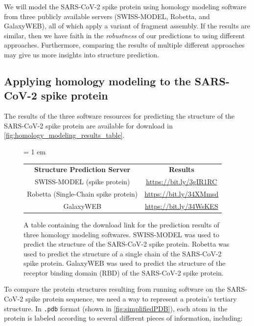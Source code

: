 We will model the SARS-CoV-2 spike protein using homology modeling software from three publicly available servers (SWISS-MODEL, Robetta, and GalaxyWEB), all of which apply a variant of fragment assembly. If the results are similar, then we have faith in the \textit{robustness} of our predictions to using different approaches. Furthermore, comparing the results of multiple different approaches may give us more insights into structure prediction. 

\FloatBarrier
{}
\subsection{Applying homology modeling to the SARS-CoV-2 spike protein}

The results of the three software resources for predicting the structure of the SARS-CoV-2 spike protein are available for download in \autoref{fig:homology_modeling_results_table}.

\begin{figure}[h]
	\raggedleft
	\tabcolsep = 1 em
	\mySfFamily
	\begin{tabular}{c c}
		\textbf{Structure Prediction Server} & \textbf{Results} \\
		SWISS-MODEL (spike protein) & \url{https://bit.ly/3gIR1RC} \\
		Robetta (Single-Chain spike protein) & \url{https://bit.ly/34XMmsd} \\
		GalaxyWEB & \url{https://bit.ly/34WsKES} \\
	\end{tabular}
	\caption{A table containing the download link for the prediction results of three homology modeling softwares. SWISS-MODEL was used to predict the structure of the SARS-CoV-2 spike protein. Robetta was used to predict the structure of a single chain of the SARS-CoV-2 spike protein. GalaxyWEB was used to predict the structure of the receptor binding domain (RBD) of the SARS-CoV-2 spike protein.}
	\label{fig:homology_modeling_results_table}
\end{figure}

To compare the protein structures resulting from running software on the SARS-CoV-2 spike protein sequence, we need a way to represent a protein's tertiary structure. In \texttt{.pdb} format (shown in \autoref{fig:simplifiedPDB}), each atom in the protein is labeled according to several different pieces of information, including:

